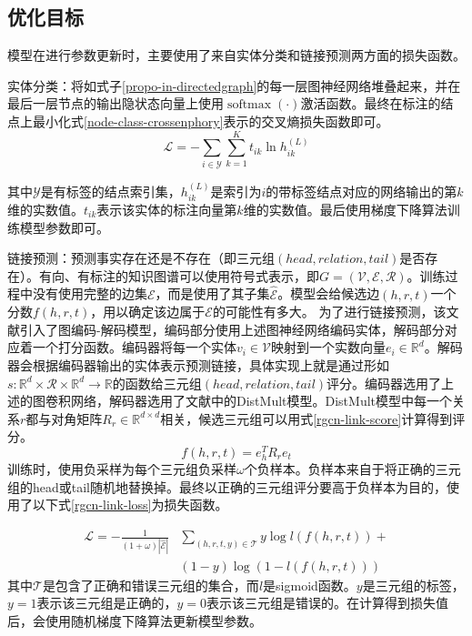 \subsection{优化目标}
模型在进行参数更新时，主要使用了来自实体分类和链接预测两方面的损失函数。

实体分类：将如式子\ref{propo-in-directedgraph}的每一层图神经网络堆叠起来，并在最后一层节点的输出隐状态向量上使用$\operatorname{softmax}(\cdot)$激活函数。最终在标注的结点上最小化式\ref{node-class-crossenphory}表示的交叉熵损失函数即可。
\begin{equation}
    \mathcal{L}=-\sum_{i \in \mathcal{Y}} \sum_{k=1}^{K} t_{i k} \ln h_{i k}^{(L)}
    \label{node-class-crossenphory}
\end{equation}

其中$\mathcal{Y}$是有标签的结点索引集，$h_{i k}^{(L)}$是索引为$i$的带标签结点对应的网络输出的第$k$维的实数值。$t_{i k}$表示该实体的标注向量第$k$维的实数值。最后使用梯度下降算法训练模型参数即可。

链接预测：预测事实存在还是不存在（即三元组$(head,relation,tail)$是否存在）。有向、有标注的知识图谱可以使用符号式表示，即$G=(\mathcal{V}, \mathcal{E}, \mathcal{R})$。训练过程中没有使用完整的边集$\mathcal{E}$，而是使用了其子集$\hat{\mathcal{E}}$。模型会给候选边$(h, r, t)$一个分数$f(h, r, t)$，用以确定该边属于$\mathcal{E}$的可能性有多大。
为了进行链接预测，该文献引入了图编码-解码模型，编码部分使用上述图神经网络编码实体，解码部分对应着一个打分函数。编码器将每一个实体$v_{i} \in \mathcal{V}$映射到一个实数向量$e_{i} \in \mathbb{R}^{d}$。解码器会根据编码器输出的实体表示预测链接，具体实现上就是通过形如$s: \mathbb{R}^{d} \times \mathcal{R} \times \mathbb{R}^{d} \rightarrow \mathbb{R}$的函数给三元组$(head, relation, tail)$评分。编码器选用了上述的图卷积网络，解码器选用了文献\parencite{yang2014embedding}中的DistMult模型。DistMult模型中每一个关系$r$都与对角矩阵$R_{r} \in \mathbb{R}^{d \times d}$相关，候选三元组可以用式\ref{rgcn-link-score}计算得到评分。
\begin{equation}
    f(h, r, t)=e_{h}^{T} R_{r} e_{t}
    \label{rgcn-link-score}
\end{equation}
训练时，使用负采样为每个三元组负采样$\omega$个负样本。负样本来自于将正确的三元组的head或tail随机地替换掉。最终以正确的三元组评分要高于负样本为目的，使用了以下式\ref{rgcn-link-loss}为损失函数。

\begin{equation}
    \begin{aligned}
        \mathcal{L}=-\frac{1}{(1+\omega)|\hat{\mathcal{E}}|} & \sum_{(h, r, t, y) \in \mathcal{T}} y \log l(f(h, r, t))+\\
        &(1-y) \log (1-l(f(h, r, t)))
        \end{aligned}
    \label{rgcn-link-loss}
\end{equation}
其中$\mathcal{T}$是包含了正确和错误三元组的集合，而$l$是sigmoid函数。$y$是三元组的标签，$y=1$表示该三元组是正确的，$y=0$表示该三元组是错误的。在计算得到损失值后，会使用随机梯度下降算法更新模型参数。

